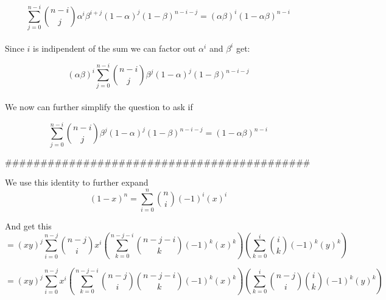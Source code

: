 \begin{equation*}
    \sum_{j=0}^{n-i} \binom{n-i}{j}\alpha^{i}\beta^{i+j}(1-\alpha)^{j}(1-\beta)^{n-i-j} = (\alpha\beta)^{i}(1-\alpha\beta)^{n-i}
\end{equation*}
\\
Since $i$ is indipendent of the sum we can factor out $\alpha^{i}$ and $\beta^{i}$ get:

\begin{equation*}
    (\alpha\beta)^{i}\sum _{j=0}^{n-i} \binom{n-i}{j}\beta^{j}(1-\alpha)^{j}(1-\beta)^{n-i-j}
\end{equation*}
\\
We now can further simplify the question to ask if

\begin{equation*}
    \sum _{j=0}^{n-i} \binom{n-i}{j}\beta^{j}(1-\alpha)^{j}(1-\beta)^{n-i-j} = (1-\alpha\beta)^{n-i}
\end{equation*}

\#\#\#\#\#\#\#\#\#\#\#\#\#\#\#\#\#\#\#\#\#\#\#\#\#\#\#\#\#\#\#\#\#\#\#\#\#\#\#\#\#\#\#

We use this identity to further expand
\begin{equation*}
    (1-x)^n =
    \sum_{i = 0}^{n} {n \choose i} (-1)^{i}(x)^{i}
\end{equation*}

And get this
\begin{equation*}
    =(xy)^j\sum _{i=0}^{n-j} \binom{n-j}{i}x^i
    (\sum_{k = 0}^{n-j-i} {n-j-i \choose k} (-1)^{k}(x)^{k})
    (\sum_{k = 0}^{i} {i \choose k} (-1)^{k}(y)^{k})
\end{equation*}

\begin{equation*}
    =(xy)^j\sum _{i=0}^{n-j}x^i
    (\sum_{k = 0}^{n-j-i} \binom{n-j}{i}{n-j-i \choose k} (-1)^{k}(x)^{k})
    (\sum_{k = 0}^{i} \binom{n-j}{i}{i \choose k} (-1)^{k}(y)^{k})
\end{equation*}